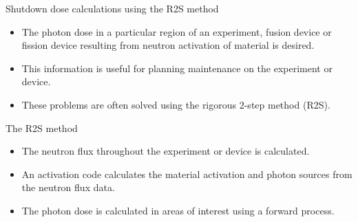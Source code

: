 \documentclass{beamer}
\begin{document}
\begin{frame}{Shutdown dose calculations using the R2S method}

  \begin{itemize}
    \item The photon dose in a particular region of an experiment, fusion
      device or fission device resulting from neutron activation of material
      is desired.
    \item This information is useful for planning maintenance on the experiment
      or device.
    \item These problems are often solved using the rigorous 2-step method 
      (R2S).
  \end{itemize}

  \medskip
  \medskip

  \begin{beamerboxesrounded}{The R2S method}
    \begin{itemize}
      \item The neutron flux throughout the experiment or device is calculated.
      \item An activation code calculates the material activation and photon
        sources from the neutron flux data.
      \item The photon dose is calculated in areas of interest using a forward
        process.
    \end{itemize}
  \end{beamerboxesrounded}

\end{frame}
\end{document}
